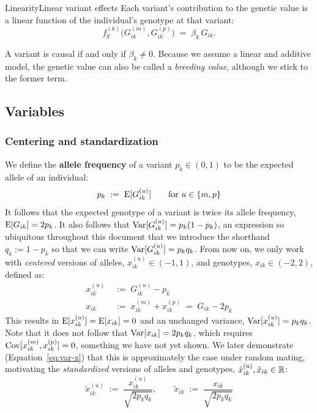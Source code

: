 \documentclass[12pt]{article}
\numberwithin{equation}{section}
\begin{document}
\begin{assumption}{Linearity}{Linear variant effects}
Each variant's contribution to the genetic value is a linear function of the individual's genotype at that variant:
\begin{equation}\label{eq:linearity}
    f_g^{(k)}\big(G_{ik}^{(m)}, G_{ik}^{(p)}\big) \;=\; \beta_k\, G_{ik} .
\end{equation}
\end{assumption}

A variant is causal if and only if $\beta_k \neq 0$.
Because we assume a linear and additive model, the genetic value can also be called a \emph{breeding value}, although we stick to the former term.

\subsection{Variables}

\subsubsection{Centering and standardization}\label{sec:standardization}
We define the \textbf{allele frequency} of a variant $p_k \in (0,1)$ to be the expected allele of an individual:
\begin{equation}\label{eq:allele-freq}
    p_k \;:=\; \mathrm{E}[G_{ik}^{(u)}] \qquad \text{for } u \in \{m, p\}
\end{equation}
It follows that the expected genotype of a variant is twice its allele frequency, $\mathrm{E}[G_{ik}] = 2 p_k$.
It also follows that $\mathrm{Var}[G_{ik}^{(u)}] = p_k (1 - p_k)$, an expression so ubiquitous throughout this document that we introduce the shorthand $q_k := 1 - p_k$ so that we can write $\mathrm{Var}[G_{ik}^{(u)}] = p_k q_k$.
From now on, we only work with \emph{centered} versions of alleles, $x_{ik}^{(u)} \in (-1,1)$, and genotypes, $x_{ik} \in (-2,2)$, defined as:
\begin{subequations}\label{eq:centered}
\begin{align}
    x_{ik}^{(u)} \;&:=\; G_{ik}^{(u)} - p_k \label{eq:centered-allele} \\
    x_{ik} \;&:=\; x_{ik}^{(m)} + x_{ik}^{(p)} \;=\; G_{ik} - 2 p_k \label{eq:centered-genotype}
\end{align}
\end{subequations}
This results in $\mathrm{E}[x_{ik}^{(u)}] = \mathrm{E}[x_{ik}] = 0$ and an unchanged variance, $\mathrm{Var}[x_{ik}^{(u)}] = p_k q_k$.
Note that it does not follow that $\mathrm{Var}[x_{ik}] = 2 p_k q_k$, which requires $\mathrm{Cov}[x_{ik}^{(m)}, x_{ik}^{(p)}] = 0$, something we have not yet shown.
We later demonstrate (Equation~\eqref{eq:var-x}) that this is approximately the case under random mating, motivating the \emph{standardized} versions of alleles and genotypes, $\tilde{x}_{ik}^{(u)}, \tilde{x}_{ik} \in \mathbb{R}$:
\begin{equation}\label{eq:standardized}
    \tilde{x}_{ik}^{(u)} \;:=\; \frac{x_{ik}^{(u)}}{\sqrt{2 p_k q_k}} , \qquad
    \tilde{x}_{ik} \;:=\; \frac{x_{ik}}{\sqrt{2 p_k q_k}}
\end{equation}
\end{document}
